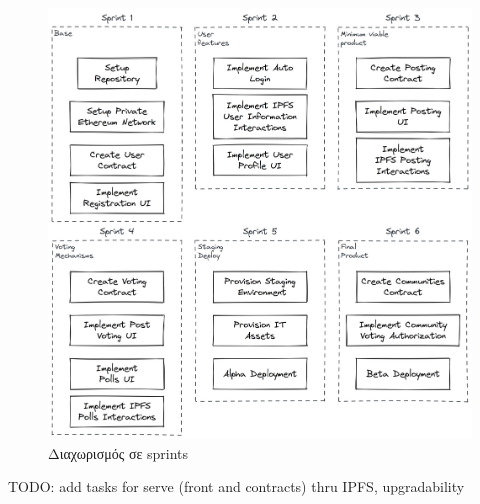 \begin{figure}[H]
    \centering
    \includegraphics[width=.8\textwidth]{assets/figures/chapter-3/3.8.implementation-methodology-specification-sprints.png}
    \caption{Διαχωρισμός σε sprints}
    \label{figure:3.8.implementation-methodology-specification-sprints}
\end{figure}

TODO: add tasks for serve (front and contracts) thru IPFS, upgradability
